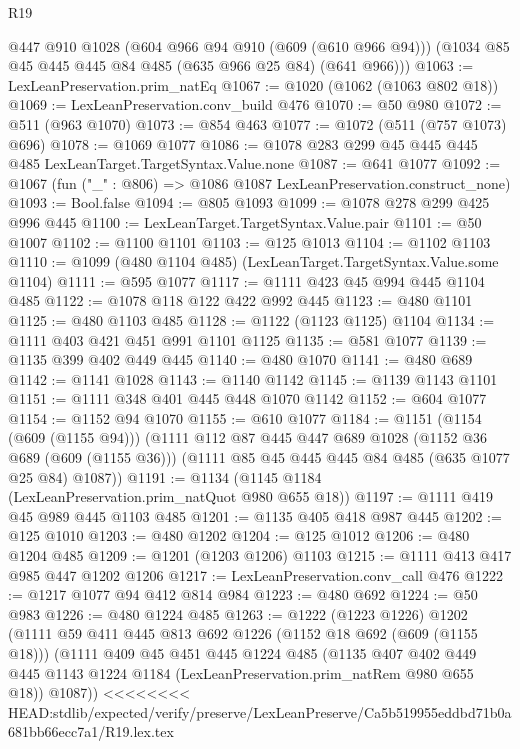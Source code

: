 \begin{lexlean}{R19}
\begin{coremodule}
{{{{{{{{{{{{{{{      @447
      @910
      @1028
      (@604 @966 @94 @910 (@609 (@610 @966 @94)))
      (@1034 @85 @45 @445 @445 @84 @485 (@635 @966 @25 @84) (@641 @966)))
@1063 := LexLeanPreservation.prim_natEq
@1067 := @1020 (@1062 (@1063 @802 @18))
@1069 := LexLeanPreservation.conv_build @476
@1070 := @50 @980
@1072 := @511 (@963 @1070)
@1073 := @854 @463
@1077 := @1072 (@511 (@757 @1073) @696)
@1078 := @1069 @1077
@1086 := @1078 @283 @299 @45 @445 @445 @485 LexLeanTarget.TargetSyntax.Value.none
@1087 := @641 @1077
@1092 := @1067 (fun ("_" : @806) => @1086 @1087 LexLeanPreservation.construct_none)
@1093 := Bool.false
@1094 := @805 @1093
@1099 := @1078 @278 @299 @425 @996 @445
@1100 := LexLeanTarget.TargetSyntax.Value.pair
@1101 := @50 @1007
@1102 := @1100 @1101
@1103 := @125 @1013
@1104 := @1102 @1103
@1110 := @1099 (@480 @1104 @485) (LexLeanTarget.TargetSyntax.Value.some @1104)
@1111 := @595 @1077
@1117 := @1111 @423 @45 @994 @445 @1104 @485
@1122 := @1078 @118 @122 @422 @992 @445
@1123 := @480 @1101
@1125 := @480 @1103 @485
@1128 := @1122 (@1123 @1125) @1104
@1134 := @1111 @403 @421 @451 @991 @1101 @1125
@1135 := @581 @1077
@1139 := @1135 @399 @402 @449 @445
@1140 := @480 @1070
@1141 := @480 @689
@1142 := @1141 @1028
@1143 := @1140 @1142
@1145 := @1139 @1143 @1101
@1151 := @1111 @348 @401 @445 @448 @1070 @1142
@1152 := @604 @1077
@1154 := @1152 @94 @1070
@1155 := @610 @1077
@1184 := @1151
    (@1154 (@609 (@1155 @94)))
    (@1111
      @112
      @87
      @445
      @447
      @689
      @1028
      (@1152 @36 @689 (@609 (@1155 @36)))
      (@1111 @85 @45 @445 @445 @84 @485 (@635 @1077 @25 @84) @1087))
@1191 := @1134 (@1145 @1184 (LexLeanPreservation.prim_natQuot @980 @655 @18))
@1197 := @1111 @419 @45 @989 @445 @1103 @485
@1201 := @1135 @405 @418 @987 @445
@1202 := @125 @1010
@1203 := @480 @1202
@1204 := @125 @1012
@1206 := @480 @1204 @485
@1209 := @1201 (@1203 @1206) @1103
@1215 := @1111 @413 @417 @985 @447 @1202 @1206
@1217 := LexLeanPreservation.conv_call @476
@1222 := @1217 @1077 @94 @412 @814 @984
@1223 := @480 @692
@1224 := @50 @983
@1226 := @480 @1224 @485
@1263 := @1222
    (@1223 @1226)
    @1202
    (@1111
      @59
      @411
      @445
      @813
      @692
      @1226
      (@1152 @18 @692 (@609 (@1155 @18)))
      (@1111
        @409
        @45
        @451
        @445
        @1224
        @485
        (@1135
          @407
          @402
          @449
          @445
          @1143
          @1224
          @1184
          (LexLeanPreservation.prim_natRem @980 @655 @18))
        @1087))
<<<<<<<< HEAD:stdlib/expected/verify/preserve/LexLeanPreserve/Ca5b519955eddbd71b0a681bb66ecc7a1/R19.lex.tex
}}}}}}}}}}}}}}}
\end{coremodule}
\end{lexlean}
